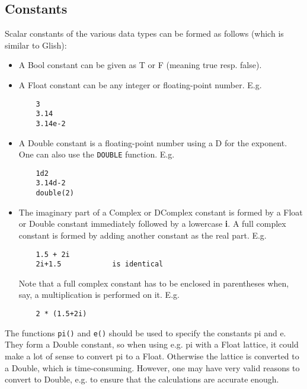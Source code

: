 \subsection{\label{LEL:CONSTANTS}Constants}
Scalar constants of the various data types can be formed as follows
(which is similar to Glish):
\begin{itemize}
  \item A Bool constant can be given as T or F (meaning true resp. false).
  \item A Float constant can be any integer or floating-point number. E.g.
    \begin{verbatim}
    3
    3.14
    3.14e-2
    \end{verbatim}
  \item A Double constant is a floating-point number using a D for the
    exponent. One can also use the \texttt{DOUBLE} function. E.g.
    \begin{verbatim}
    1d2
    3.14d-2
    double(2)
    \end{verbatim}
  \item The imaginary part of a Complex or DComplex constant is formed
    by a Float or Double constant immediately followed by a lowercase
    \textbf{i}. A full complex
    constant is formed by adding another constant as the
    real part. E.g.
    \begin{verbatim}
    1.5 + 2i
    2i+1.5            is identical
    \end{verbatim}
    Note that a full complex constant has to be enclosed
    in parentheses when, say, a multiplication is performed on it. E.g.
    \begin{verbatim}
    2 * (1.5+2i)
    \end{verbatim}
\end{itemize}
The functions \texttt{pi()} and \texttt{e()} should be
used to specify the constants pi and e. They form a Double constant,
so when using e.g. pi with a Float lattice, it could make a lot of sense
to convert pi to a Float. Otherwise the lattice is converted to a
Double, which is time-consuming. However, one may have very valid
reasons to convert to Double, e.g. to ensure that the calculations are
accurate enough.

